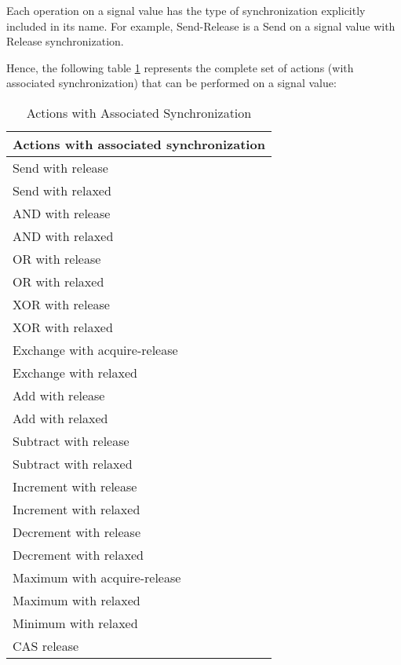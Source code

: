 Each operation on a signal value has the type of synchronization
explicitly included in its name. For example, Send-Release is a Send
on a signal value with Release synchronization.

Hence, the following table \ref{actionswsync} represents the complete set of actions (with
associated synchronization) that can be performed on a signal value:

\begin{table}[!htbp]
  \begin{center}
    \begin{tabular}{p{4in}}
      \hline
      \textbf{Actions with associated synchronization} \\ 
      \hline
      Send with release \\
      \hline
      Send with relaxed \\
      \hline
      AND with release \\
      \hline
      AND with relaxed \\
      \hline
      OR with release \\
      \hline
      OR with relaxed \\
      \hline
      XOR with release \\
      \hline
      XOR with relaxed \\
      \hline
      Exchange with acquire-release \\
      \hline
      Exchange with relaxed \\
      \hline
      Add with release \\
      \hline
      Add with relaxed \\
      \hline
      Subtract with release \\
      \hline
      Subtract with relaxed \\
      \hline
      Increment with release \\
      \hline
      Increment with relaxed \\
      \hline
      Decrement with release \\
      \hline
      Decrement with relaxed \\
      \hline
      Maximum with acquire-release \\
      \hline
      Maximum with relaxed \\
      \hline
      Minimum with relaxed \\
      \hline
      CAS release \\
      \hline
    \end{tabular}
  \end{center}
  \caption{Actions with Associated Synchronization}
  \label{actionswsync}
\end{table}

